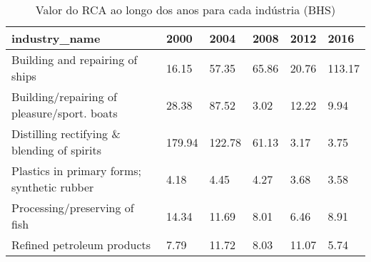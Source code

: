\begin{table}
\centering
\caption{Valor do RCA ao longo dos anos para cada indústria (BHS)}
\begin{tabular}{p{6cm}p{1.5cm}p{1.5cm}p{1.5cm}p{1.5cm}p{1.5cm}}
\toprule
                              industry\_name &   2000 &   2004 &  2008 &  2012 &   2016 \\
\midrule
            Building and repairing of ships &  16.15 &  57.35 & 65.86 & 20.76 & 113.17 \\
Building/repairing of pleasure/sport. boats &  28.38 &  87.52 &  3.02 & 12.22 &   9.94 \\
Distilling rectifying \& blending of spirits & 179.94 & 122.78 & 61.13 &  3.17 &   3.75 \\
Plastics in primary forms; synthetic rubber &   4.18 &   4.45 &  4.27 &  3.68 &   3.58 \\
              Processing/preserving of fish &  14.34 &  11.69 &  8.01 &  6.46 &   8.91 \\
                 Refined petroleum products &   7.79 &  11.72 &  8.03 & 11.07 &   5.74 \\
\bottomrule
\end{tabular}
\end{table}
